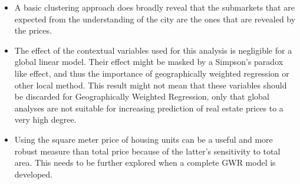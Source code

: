 \documentclass[journal]{IEEEtran}
\begin{document}
\begin{itemize}
\item A basic clustering approach does broadly reveal that the submarkets that are expected from the understanding of the city are the ones that are revealed by the prices.
\item The effect of the contextual variables used for this analysis is negligible for a global linear model. Their effect might be masked by a Simpson’s paradox like effect, and thus the importance of geographically weighted regression or other local method. This result
might not mean that these variables should be discarded for Geographically Weighted Regression, only that global analyses are not
suitable for increasing prediction of real estate prices to a very high degree.
\item Using the square meter price of housing units can be a useful and more robust measure than total price because of the latter’s sensitivity to total area. This needs to be further explored when a complete GWR model is developed.
\end{itemize}


%
%

\end{document}
